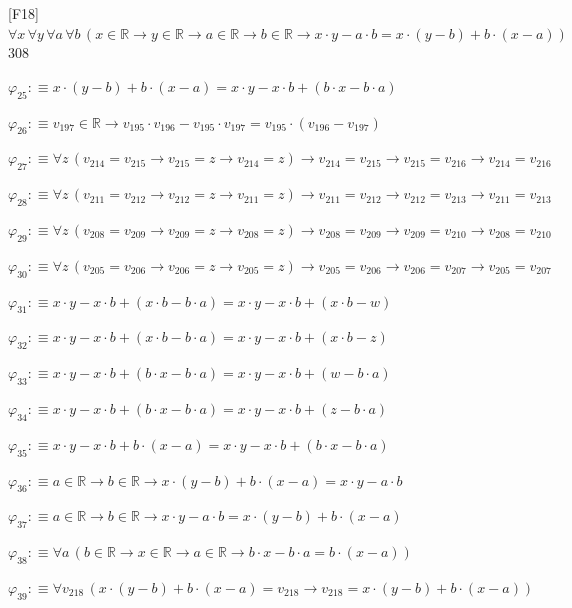 \begin{fullproof}{[F18]}{$\forall x\,\forall y\,\forall a\,\forall b\,(x \in \mathbb{R} \to y \in \mathbb{R} \to a \in \mathbb{R} \to b \in \mathbb{R} \to x \cdot y - a \cdot b = x \cdot (y - b) + b \cdot (x - a))$}{308}
\begin{abbrevlist}
\item $\varphi_{25} :\equiv x \cdot (y - b) + b \cdot (x - a) = x \cdot y - x \cdot b + (b \cdot x - b \cdot a)$
\item $\varphi_{26} :\equiv v_{197} \in \mathbb{R} \to v_{195} \cdot v_{196} - v_{195} \cdot v_{197} = v_{195} \cdot (v_{196} - v_{197})$
\item $\varphi_{27} :\equiv \forall z\,(v_{214} = v_{215} \to v_{215} = z \to v_{214} = z) \to v_{214} = v_{215} \to v_{215} = v_{216} \to v_{214} = v_{216}$
\item $\varphi_{28} :\equiv \forall z\,(v_{211} = v_{212} \to v_{212} = z \to v_{211} = z) \to v_{211} = v_{212} \to v_{212} = v_{213} \to v_{211} = v_{213}$
\item $\varphi_{29} :\equiv \forall z\,(v_{208} = v_{209} \to v_{209} = z \to v_{208} = z) \to v_{208} = v_{209} \to v_{209} = v_{210} \to v_{208} = v_{210}$
\item $\varphi_{30} :\equiv \forall z\,(v_{205} = v_{206} \to v_{206} = z \to v_{205} = z) \to v_{205} = v_{206} \to v_{206} = v_{207} \to v_{205} = v_{207}$
\item $\varphi_{31} :\equiv x \cdot y - x \cdot b + (x \cdot b - b \cdot a) = x \cdot y - x \cdot b + (x \cdot b - w)$
\item $\varphi_{32} :\equiv x \cdot y - x \cdot b + (x \cdot b - b \cdot a) = x \cdot y - x \cdot b + (x \cdot b - z)$
\item $\varphi_{33} :\equiv x \cdot y - x \cdot b + (b \cdot x - b \cdot a) = x \cdot y - x \cdot b + (w - b \cdot a)$
\item $\varphi_{34} :\equiv x \cdot y - x \cdot b + (b \cdot x - b \cdot a) = x \cdot y - x \cdot b + (z - b \cdot a)$
\item $\varphi_{35} :\equiv x \cdot y - x \cdot b + b \cdot (x - a) = x \cdot y - x \cdot b + (b \cdot x - b \cdot a)$
\item $\varphi_{36} :\equiv a \in \mathbb{R} \to b \in \mathbb{R} \to x \cdot (y - b) + b \cdot (x - a) = x \cdot y - a \cdot b$
\item $\varphi_{37} :\equiv a \in \mathbb{R} \to b \in \mathbb{R} \to x \cdot y - a \cdot b = x \cdot (y - b) + b \cdot (x - a)$
\item $\varphi_{38} :\equiv \forall a\,(b \in \mathbb{R} \to x \in \mathbb{R} \to a \in \mathbb{R} \to b \cdot x - b \cdot a = b \cdot (x - a))$
\item $\varphi_{39} :\equiv \forall v_{218}\,(x \cdot (y - b) + b \cdot (x - a) = v_{218} \to v_{218} = x \cdot (y - b) + b \cdot (x - a))$

\end{abbrevlist}
\end{fullproof}
